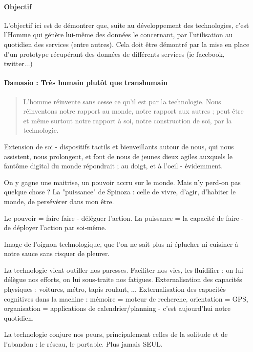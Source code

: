 \paragraph{Objectif} L'objectif ici est de démontrer que, suite au développement des technologies, c'est l'Homme
qui génère lui-même des données le concernant, par l'utilisation au quotidien des services (entre autres).
Cela doit être démontré par la mise en place d'un prototype récupérant des données de différents
services (ie facebook, twitter...)

\paragraph{Damasio : Très humain plutôt que transhumain}

\begin{quotation}
    L'homme réinvente sans cesse ce qu'il est par la technologie. Nous réinventons notre
    rapport au monde, notre rapport aux autres ; peut être et même surtout notre rapport à soi, 
    notre construction de soi, par la technologie. \cite{Damasio2}
\end{quotation}

Extension de soi - dispositifs tactils et bienveillants autour de nous, qui nous assistent,
nous prolongent, et font de nous de jeunes dieux agiles auxquels le fantôme digital du monde répondrait
; au doigt, et à l'oeil - évidemment.

On y gagne une maitrise, un pouvoir accru sur le monde. Mais n'y perd-on pas quelque chose ?
La "puissance" de Spinoza : celle de vivre, d'agir, d'habiter le monde, de persévérer dans mon être.

Le pouvoir = faire faire - déléguer l'action.
La puissance = la capacité de faire - de déployer l'action par soi-même.

Image de l'oignon technologique, que l'on ne sait plus ni éplucher ni cuisiner à notre
sauce sans risquer de pleurer.

La technologie vient outiller nos paresses. Faciliter nos vies, les fluidifier : on lui
délègue nos efforts, on lui sous-traite nos fatigues. Externalisation des capacités physiques :
voitures, métro, tapis roulant, ... Externalisation des capacités cognitives dans la machine :
mémoire = moteur de recherche, orientation = GPS, organisation = applications de
calendrier/planning - c'est aujourd'hui notre quotidien.

La technologie conjure nos peurs, principalement celles de la solitude et de l'abandon :
le réseau, le portable. Plus jamais SEUL.

